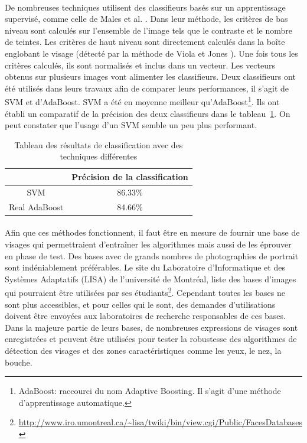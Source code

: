 \documentclass[11pt, french,screen]{report-rd-info}
\begin{document}
\paragraph*{}
De nombreuses techniques utilisent des classifieurs basés sur un apprentissage supervisé, comme celle de Males et al. \cite{Males2013}. Dans leur méthode, les critères de bas niveau sont calculés sur l’ensemble de l’image tels que le contraste et le nombre de teintes. Les critères de haut niveau sont directement calculés dans la boîte englobant le visage (détecté par la méthode de Viola et Jones \cite{Viola2004}). Une fois tous les critères calculés, ils sont normalisés et inclus dans un vecteur. Les vecteurs obtenus sur plusieurs images vont alimenter les classifieurs. Deux classifieurs ont été utilisés dans leurs travaux afin de comparer leurs performances, il s’agit de SVM et d’AdaBoost. SVM a été en moyenne meilleur qu’AdaBoost\footnote{AdaBoost: raccourci du nom Adaptive Boosting. Il s'agit d'une méthode d'apprentissage automatique.}. Ils ont établi un comparatif de la précision des deux classifieurs dans le tableau~\ref{tab:ComparaisonSVMAdaBoost}. On peut constater que l'usage d'un SVM semble un peu plus performant.
\begin{table}
\begin{center}
\begin{tabular}{|c|c|}
\hline
& Précision de la classification \\
\hline
SVM & 86.33\% \\
\hline
Real AdaBoost & 84.66\% \\
\hline
\end{tabular}
\end{center}
\caption{Tableau des résultats de classification avec des techniques différentes \cite{Males2013}}
\label{tab:ComparaisonSVMAdaBoost}
\end{table}
\paragraph*{}
Afin que ces méthodes fonctionnent, il faut être en mesure de fournir une base de visages qui permettraient d'entraîner les algorithmes mais aussi de les éprouver en phase de test.
Des bases avec de grands nombres de photographies de portrait sont indéniablement préférables. Le site du Laboratoire d'Informatique et des Systèmes Adaptatifs (LISA) de l'université de Montréal, liste des bases d'images qui pourraient être utilisées par ses étudiants\footnote{\url{http://www.iro.umontreal.ca/~lisa/twiki/bin/view.cgi/Public/FacesDatabases}}. Cependant toutes les bases ne sont plus accessibles, et pour celles qui le sont, des demandes d'utilisations doivent être envoyées aux laboratoires de recherche responsables de ces bases. Dans la majeure partie de leurs bases, de nombreuses expressions de visages sont enregistrées et peuvent être utilisées pour tester la robustesse des algorithmes de détection des visages et des zones caractéristiques comme les yeux, le nez, la bouche.
\end{document}
